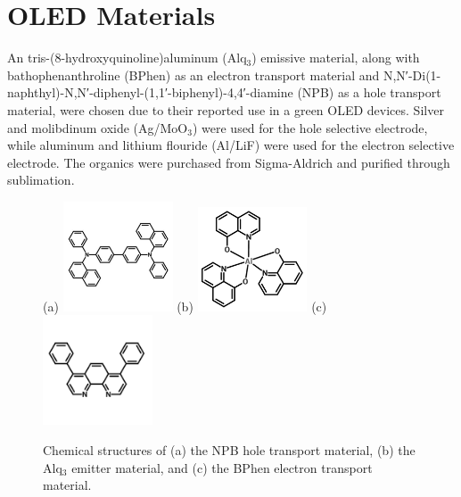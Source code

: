 \documentclass{report}
\begin{document}
    \section{OLED Materials} \label{materials}
    An tris-(8-hydroxyquinoline)aluminum (Alq$_3$) emissive material, along with bathophenanthroline (BPhen) as an electron transport material and N,N′-Di(1-naphthyl)-N,N′-diphenyl-(1,1′-biphenyl)-4,4′-diamine (NPB) as a hole transport material, were chosen due to their reported use in a green OLED devices\cite{Cai2011,Matsushima2008}. Silver and molibdinum oxide (Ag/MoO$_3$) were used for the hole selective electrode, while aluminum and lithium flouride (Al/LiF) were used for the electron selective electrode. The organics were purchased from Sigma-Aldrich and purified through sublimation.\\
    \begin{figure}[h!]
        \centering
        (a)
        \includegraphics[width=0.29\textwidth]{images/npb_structure.jpg}
        (b)
        \includegraphics[width=0.29\textwidth]{images/alq3_structure.png}
        (c)
        \includegraphics[width=0.29\textwidth]{images/bphen_structure.jpg}
        \caption{Chemical structures of (a) the NPB hole transport material, (b) the Alq$_3$ emitter material, and (c) the BPhen electron transport material.}
        \label{fig:structures}
    \end{figure}
    \newpage
\end{document}
